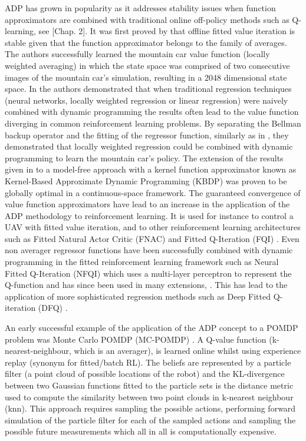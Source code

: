 \documentclass[final,5p,times,twocolumn]{elsarticle}
\begin{document}
ADP has grown in popularity as it addresses stability issues when function approximators are combined 
with traditional online off-policy methods such as Q-learning, see \cite{RL_state_art_2012}[Chap. 2].
It was first proved by \cite{stable_FA_gordon_1995} that offline fitted value iteration is stable given that 
the function approximator belongs to the family of averages. The authors successfully learned the mountain car value
function (locally weighted averaging) in which the state space was comprised of two consecutive images of the mountain car's 
simulation, resulting in a 2048 dimensional state space. 
In \cite{Boyan95generalizationin} the authors demonstrated that when traditional regression techniques 
(neural networks, locally weighted regression or linear regression) were naively combined with dynamic programming  
the results often lead to the value function diverging in common reinforcement learning problems. By separating 
the Bellman backup operator and the fitting of the regressor function, similarly as in \cite{stable_FA_gordon_1995}, 
they demonstrated that locally weighted regression could be combined with dynamic programming to learn the mountain car's policy. 
The extension of the results given in \cite{stable_FA_gordon_1995} to a model-free approach with a kernel function 
approximator known as Kernel-Based Approximate Dynamic Programming (KBDP) \cite{kernel_rl_ormoneit_2002} was proven to 
be globally optimal in a continuous-space framework. The guaranteed convergence of value function approximators have
lead to an increase in the application of the ADP methodology to reinforcement learning. It is used for instance  
to control a UAV with fitted value iteration\cite{fvi_uav_2010}, and to 
other reinforcement learning architectures such as Fitted Natural Actor Critic (FNAC) \cite{Melo2008} and 
Fitted Q-Iteration (FQI) \cite{EGW05,fqi_nips_peter_2009}. Even non averager regressor functions have been successfully 
combined with dynamic programming in the fitted reinforcement learning framework such as 
Neural Fitted Q-Iteration (NFQI) \cite{Riedmiller2005} which uses a multi-layer perceptron to represent the Q-function 
and has since been used in many extensions, \cite{NAC_2008,rl_gmm_2010}. 
This has lead to the application of more sophisticated regression methods such as Deep Fitted Q-iteration (DFQ) 
\cite{Lange_riedmiller_2010,mnih-dqn-2015,DRQ_AAAI_2015}.

An early successful example of the application of the ADP concept to a POMDP problem was Monte Carlo POMDP (MC-POMDP) 
\cite{Thrun_1999}. A Q-value function (k-nearest-neighbour, which is an averager), is learned online whilst using 
experience replay (synonym for fitted/batch RL). The beliefs are represented by a particle filter 
(a point cloud of possible locations of the robot) and the KL-divergence 
between two Gaussian functions fitted to the particle sets is the distance metric used to compute the similarity 
between two point clouds in k-nearest neighbour (knn). This approach requires sampling the possible actions, performing 
forward simulation of the particle filter for each of the sampled actions and sampling the possible future measurements which all 
in all is computationally expensive. 
\end{document}
